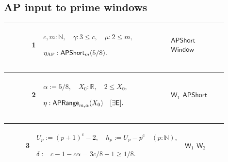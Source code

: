 \documentclass[12pt,reqno]{amsart}
\theoremstyle{blueplain}
\numberwithin{equation}{section}
\begin{document}
\subsection{AP input to prime windows}

\label{sec:ap-window-proof} {\scriptsize \setlength{\parskip}{0pt} \noindent 
\begin{tabular}{|@{}>{\centering\arraybackslash}m{0.10658\linewidth}|>{\centering\arraybackslash}m{0.03553\linewidth}|>{\centering\arraybackslash}m{0.52105\linewidth}|>{\centering\arraybackslash}m{0.23684\linewidth}|}
\hline
{\hypertarget{row:W1}{$\mathsf{W}$}} & {1} & {$\displaystyle c,m:\mathbb{N}%
,\quad\gamma:3\le c,\quad\mu:2\le m,$ \par$\displaystyle \eta_{\mathrm{AP}}: 
\hyperlink{def:APShort}{\mathsf{APShort} }_m(5/8).$} & {\hyperlink{def:APShort}%
{$\mathsf{APShort}$} \hyperlink{def:Window}{$\mathsf{Window}$}} \\ \hline
\end{tabular}%
}

{\scriptsize \setlength{\parskip}{0pt}\nointerlineskip
\noindent 
\begin{tabular}{|@{}>{\centering\arraybackslash}m{0.10658\linewidth}|>{\centering\arraybackslash}m{0.03553\linewidth}|>{\centering\arraybackslash}m{0.52105\linewidth}|>{\centering\arraybackslash}m{0.23684\linewidth}|}
\hline
{\hypertarget{row:W2}{$\mathsf{W}$}} & {2} & {$\displaystyle %
\alpha:=5/8,\quad X_0:\mathbb{R},\quad2\le X_0,$ \par$\displaystyle \eta: 
\hyperlink{def:APRange}{\mathsf{APRange} }_{m,\alpha}(X_0)\quad[\exists%
\mathsf{E}].$} & {\hyperlink{row:W1}{$\mathsf{W}_{1}$} \hyperlink{def:APShort}%
{$\mathsf{APShort}$}} \\ \hline
\end{tabular}%
}

{\scriptsize \setlength{\parskip}{0pt}\nointerlineskip
\noindent 
\begin{tabular}{|@{}>{\centering\arraybackslash}m{0.10658\linewidth}|>{\centering\arraybackslash}m{0.03553\linewidth}|>{\centering\arraybackslash}m{0.52105\linewidth}|>{\centering\arraybackslash}m{0.23684\linewidth}|}
\hline
{\hypertarget{row:W3}{$\mathsf{W}$}} & {3} & {$\displaystyle %
U_p:=(p+1)^c-2,\quad h_p:=U_p-p^c\quad(p:\mathbb{N}),$ \par$\displaystyle %
\delta:=c-1-c\alpha=3c/8-1\ge1/8.$} & {\hyperlink{row:W1}{$\mathsf{W}_{1}$} 
\hyperlink{row:W2}{$\mathsf{W}_{2}$}} \\ \hline
\end{tabular}%
}
\end{document}
